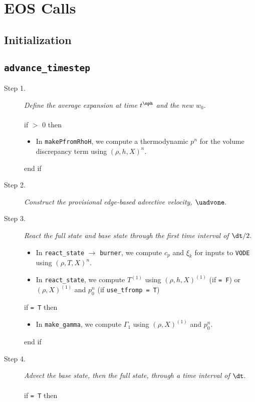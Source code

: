 \section{EOS Calls}

\subsection{Initialization}

\subsection{{\tt advance\_timestep}}

\begin{description}
\item[Step 1.] {\em Define the average expansion at time $t^\nph$ and the new $w_0.$}\\ \\
if  $>$ 0 then
%
\begin{itemize}
\item In {\tt makePfromRhoH}, we compute a thermodynamic $p^n$ for the volume discrepancy 
term using $(\rho,h,X)^n$.
\end{itemize}
end if
\item[Step 2.] {\em Construct the provisional edge-based advective velocity, $\uadvone.$}
\item[Step 3.] {\em React the full state and base state through the first time interval 
of $\dt/2.$}
\begin{itemize}
\item In {\tt react\_state} $\rightarrow$ {\tt burner}, we compute $c_p$ and $\xi_k$ 
for inputs to {\tt VODE} using $(\rho,T,X)^n$.
\item In {\tt react\_state}, we compute $T^{(1)}$ using $(\rho,h,X)^{(1)}$ 
(if  {\tt = F}) or $(\rho,X)^{(1)}$ and $p_0^n$ (if {\tt use\_tfromp = T})
\end{itemize}
if  {\tt = T} then
\begin{itemize}
\item In {\tt make\_gamma}, we compute $\Gamma_1$ using $(\rho,X)^{(1)}$ and $p_0^n$.
\end{itemize}
end if
\item[Step 4.] {\em Advect the base state, then the full state, through a time interval 
of $\dt.$}\\ \\
if  {\tt = T} then

\end{description}
